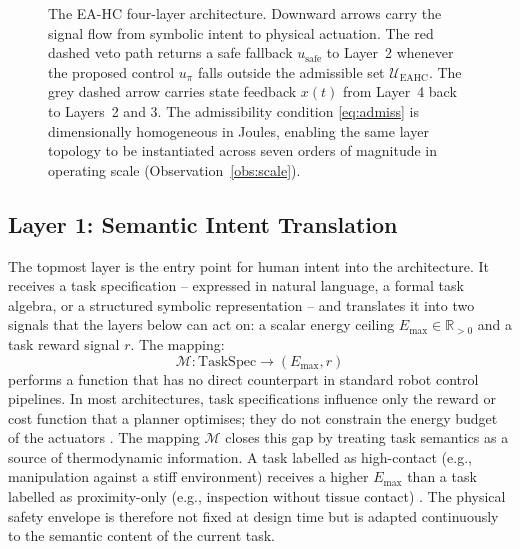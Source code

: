 \documentclass[11pt]{article}
\begin{document}
\begin{figure}[t]
{%
}%
\caption{The EA-HC four-layer architecture. Downward arrows carry the signal flow from
symbolic intent to physical actuation. The red dashed veto path returns a safe fallback
$u_{\mathrm{safe}}$ to Layer~2 whenever the proposed control $u_\pi$ falls outside the
admissible set $\mathcal{U}_{\mathrm{EAHC}}$. The grey dashed arrow carries state feedback
$x(t)$ from Layer~4 back to Layers~2 and 3. The admissibility condition \eqref{eq:admiss}
is dimensionally homogeneous in Joules, enabling the same layer topology to be instantiated
across seven orders of magnitude in operating scale (Observation~\ref{obs:scale}).}
\label{fig:arch}
\end{figure}

\subsection{Layer 1: Semantic Intent Translation}
\label{sec:layer1}

The topmost layer is the entry point for human intent into the architecture. It receives a task
specification -- expressed in natural language, a formal task algebra, or a structured symbolic
representation -- and translates it into two signals that the layers below can act on: a scalar
energy ceiling $E_{\max}\in\mathbb{R}_{>0}$ and a task reward signal $r$. The mapping:
\begin{equation}
\mathcal{M}:\text{TaskSpec}\to(E_{\max},r)
\label{eq:mapping}
\end{equation}
performs a function that has no direct counterpart in standard robot control pipelines. In
most architectures, task specifications influence only the reward or cost function that a planner
optimises; they do not constrain the energy budget of the actuators \cite{kober2013,sutton2018}.
The mapping $\mathcal{M}$ closes this gap by treating task semantics as a source of
thermodynamic information. A task labelled as high-contact (e.g., manipulation against a
stiff environment) receives a higher $E_{\max}$ than a task labelled as proximity-only
(e.g., inspection without tissue contact) \cite{ferraguti2015,haddadin2017}. The physical safety
envelope is therefore not fixed at design time but is adapted continuously to the semantic
content of the current task.
\end{document}
